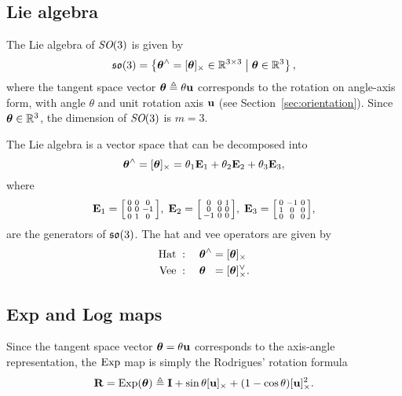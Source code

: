 \subsection{Lie algebra}
The Lie algebra of $\textit{SO}(3)$ is given by
\begin{equation}
  {\mathfrak {so}}(3) = \left \{ {\boldsymbol{\mathbf{\theta}}}^\wedge = [{\boldsymbol{\mathbf{\theta}}}]_\times \in {\mathbb R}^{3 \times 3} \;\middle|\; {\boldsymbol{\mathbf{\theta}}} \in {\mathbb R}^3 \right \},
\end{equation}
where the tangent space vector ${\boldsymbol{\mathbf{\theta}}} \triangleq \theta {\boldsymbol{\mathbf{u}}}$ corresponds to the rotation on angle-axis form, with angle $\theta$ and unit rotation axis ${\boldsymbol{\mathbf{u}}}$ (see Section~\ref{sec:orientation}).
Since ${\boldsymbol{\mathbf{\theta}}} \in {\mathbb R}^3$, the dimension of $\textit{SO}(3)$ is $m = 3$.

The Lie algebra is a vector space that can be decomposed into
\begin{equation}
  {\boldsymbol{\mathbf{\theta}}}^\wedge = [{\boldsymbol{\mathbf{\theta}}}]_\times = \theta_1 {\boldsymbol{\mathbf{E}}}_1 + \theta_2 {\boldsymbol{\mathbf{E}}}_2 + \theta_3 {\boldsymbol{\mathbf{E}}}_3,
\end{equation}
where
\begin{equation}
  {\boldsymbol{\mathbf{E}}}_1 =
  \begin{bsmallmatrix}
    0 & 0 & 0\\
    0 & 0 & -1\\
    0 & 1 & 0
  \end{bsmallmatrix}, \;
  {\boldsymbol{\mathbf{E}}}_2 =
  \begin{bsmallmatrix}
    0 & 0 & 1\\
    0 & 0 & 0\\
    -1 & 0 & 0
  \end{bsmallmatrix}, \;
  {\boldsymbol{\mathbf{E}}}_3 =
  \begin{bsmallmatrix}
    0 & -1 & 0\\
    1 & 0 & 0\\
    0 & 0 & 0
  \end{bsmallmatrix},
\end{equation}
are the generators of ${\mathfrak {so}}(3)$. The hat and vee operators are given by
\begin{align}
\begin{alignedat}{2}
  \text{Hat} \; &: \quad {\boldsymbol{\mathbf{\theta}}}^\wedge &&= [{\boldsymbol{\mathbf{\theta}}}]_\times\\
  \text{Vee} \; &: \quad {\boldsymbol{\mathbf{\theta}}} &&= [{\boldsymbol{\mathbf{\theta}}}]^\vee_\times.
\end{alignedat}
\end{align}

\subsection{Exp and Log maps} \label{sec:Exp-Log-SO3}
Since the tangent space vector ${\boldsymbol{\mathbf{\theta}}} = \theta {\boldsymbol{\mathbf{u}}}$ corresponds to the axis-angle representation, the $\operatorname*{Exp}$ map is simply the Rodrigues' rotation formula
\begin{equation} \label{eq:Exp-SO3}
  {\boldsymbol{\mathbf{R}}} = \operatorname*{Exp}({\boldsymbol{\mathbf{\theta}}}) \triangleq {\boldsymbol{\mathbf{I}}} + \sin \theta [{\boldsymbol{\mathbf{u}}}]_\times + (1 - \cos \theta) [{\boldsymbol{\mathbf{u}}}]^2_\times.
\end{equation}

